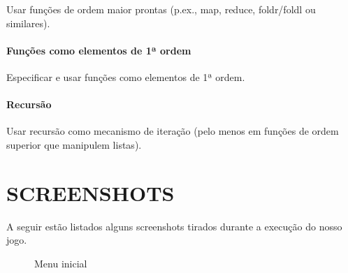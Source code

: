 \documentclass[rel_mlp]{iiufrgs}
\begin{document}
Usar funções de ordem maior prontas (p.ex., map, reduce, foldr/foldl ou similares).


\subsubsection{Funções como elementos de 1ª ordem}

Especificar e usar funções como elementos de 1ª ordem.


\subsubsection{Recursão}

Usar recursão como mecanismo de iteração (pelo menos em funções de ordem superior que manipulem listas).

%
\chapter{SCREENSHOTS}

A seguir estão listados alguns screenshots tirados durante a execução do nosso jogo.

\begin{figure}[htb]
    \centering
    \caption{Menu inicial}
    \label{fig:figura1}
\end{figure}
\end{document}
